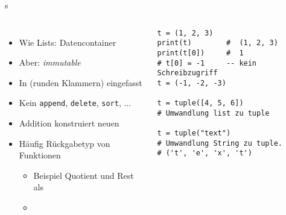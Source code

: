 
\begin{frame}[fragile]{s}
%
\begin{columns}[T]
\begin{itemize}
\item Wie Lists: Datencontainer
\item Aber: \emph{immutable}
\item In (runden Klammern) eingefasst
\item Kein \texttt{append}, \texttt{delete}, \texttt{sort}, ...
\item Addition konstruiert neuen 
\item Häufig Rückgabetyp von Funktionen
	\begin{itemize}
	\item Beispiel  Quotient und Rest als 
	\item {} \thus ~ 
	\end{itemize}

\end{itemize}
%
\begin{codebox}
\begin{verbatim}
t = (1, 2, 3)
print(t)        #  (1, 2, 3)
print(t[0])     #  1
# t[0] = -1     -- kein Schreibzugriff
t = (-1, -2, -3)

t = tuple([4, 5, 6])
# Umwandlung list zu tuple

t = tuple("text")
# Umwandlung String zu tuple.
# ('t', 'e', 'x', 't')
\end{verbatim}
\end{codebox}
\end{columns}
%
\end{frame}


